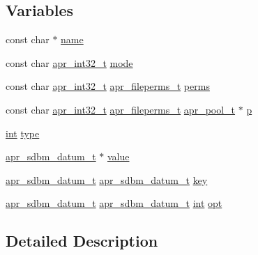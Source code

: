 \subsection*{Variables}
\begin{DoxyCompactItemize}
\item 
const char $\ast$ \hyperlink{group__APR__Util__DBM__SDBM_ga8f8f80d37794cde9472343e4487ba3eb}{name}
\item 
const char \hyperlink{group__apr__platform_ga21ef1e35fd3ff9be386f3cb20164ff02}{apr\+\_\+int32\+\_\+t} \hyperlink{group__APR__Util__DBM__SDBM_ga719919dff9b073c668fd47f22f420774}{mode}
\item 
const char \hyperlink{group__apr__platform_ga21ef1e35fd3ff9be386f3cb20164ff02}{apr\+\_\+int32\+\_\+t} \hyperlink{group__apr__file__info_ga3af19c4c47007169064a70f9351bc7d8}{apr\+\_\+fileperms\+\_\+t} \hyperlink{group__APR__Util__DBM__SDBM_ga4644cd2c8097d1b754ec32f7c5ea6d5b}{perms}
\item 
const char \hyperlink{group__apr__platform_ga21ef1e35fd3ff9be386f3cb20164ff02}{apr\+\_\+int32\+\_\+t} \hyperlink{group__apr__file__info_ga3af19c4c47007169064a70f9351bc7d8}{apr\+\_\+fileperms\+\_\+t} \hyperlink{structapr__pool__t}{apr\+\_\+pool\+\_\+t} $\ast$ \hyperlink{group__APR__Util__DBM__SDBM_ga766306d113a8e2b594eaaae5b3156b2e}{p}
\item 
\hyperlink{pcre_8txt_a42dfa4ff673c82d8efe7144098fbc198}{int} \hyperlink{group__APR__Util__DBM__SDBM_gac765329451135abec74c45e1897abf26}{type}
\item 
\hyperlink{structapr__sdbm__datum__t}{apr\+\_\+sdbm\+\_\+datum\+\_\+t} $\ast$ \hyperlink{group__APR__Util__DBM__SDBM_ga711ebc0efad43aba10f32ded4a28cf17}{value}
\item 
\hyperlink{structapr__sdbm__datum__t}{apr\+\_\+sdbm\+\_\+datum\+\_\+t} \hyperlink{structapr__sdbm__datum__t}{apr\+\_\+sdbm\+\_\+datum\+\_\+t} \hyperlink{group__APR__Util__DBM__SDBM_ga3aaa51a0f0ad91af61adcd67436260aa}{key}
\item 
\hyperlink{structapr__sdbm__datum__t}{apr\+\_\+sdbm\+\_\+datum\+\_\+t} \hyperlink{structapr__sdbm__datum__t}{apr\+\_\+sdbm\+\_\+datum\+\_\+t} \hyperlink{pcre_8txt_a42dfa4ff673c82d8efe7144098fbc198}{int} \hyperlink{group__APR__Util__DBM__SDBM_ga7dabf0be7fe6c0e41bab93d005632e83}{opt}
\end{DoxyCompactItemize}


\subsection{Detailed Description}


